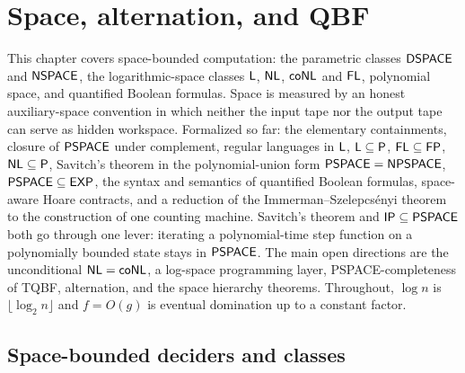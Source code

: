 \chapter{Space, alternation, and QBF}
\label{chap:space}

This chapter covers space-bounded computation: the parametric classes
$\mathsf{DSPACE}$ and $\mathsf{NSPACE}$, the logarithmic-space classes $\mathsf{L}$,
$\mathsf{NL}$, $\mathsf{coNL}$ and $\mathsf{FL}$, polynomial space, and quantified Boolean
formulas. Space is measured by an honest auxiliary-space convention in which
neither the input tape nor the output tape can serve as hidden workspace.
Formalized so far: the elementary containments, closure of $\mathsf{PSPACE}$ under
complement, regular languages in $\mathsf{L}$, $\mathsf{L} \subseteq \mathsf{P}$,
$\mathsf{FL} \subseteq \mathsf{FP}$, $\mathsf{NL} \subseteq \mathsf{P}$, Savitch's theorem in
the polynomial-union form $\mathsf{PSPACE} = \mathsf{NPSPACE}$,
$\mathsf{PSPACE} \subseteq \mathsf{EXP}$, the syntax and semantics of quantified
Boolean formulas, space-aware Hoare contracts, and a reduction of the
Immerman--Szelepcs\'enyi theorem to the construction of one counting machine.
Savitch's theorem and $\mathsf{IP} \subseteq \mathsf{PSPACE}$ both go through one
lever: iterating a polynomial-time step function on a polynomially bounded
state stays in $\mathsf{PSPACE}$. The main open directions are the unconditional
$\mathsf{NL} = \mathsf{coNL}$, a log-space programming layer, PSPACE-completeness of
TQBF, alternation, and the space hierarchy theorems. Throughout, $\log n$ is
$\lfloor \log_2 n \rfloor$ and $f = O(g)$ is eventual domination up to a
constant factor.

\section{Space-bounded deciders and classes}

